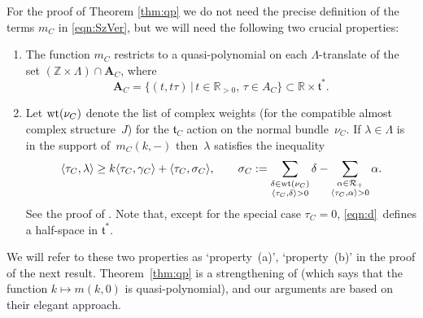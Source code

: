 \documentclass[pdftex]{sigma}
\numberwithin{equation}{section}
\newcommand{\pair}[2]{\langle #1, #2 \rangle}
\newcommand{\tn}[1]{\textnormal{#1}}
\def\t{\ensuremath{\mathfrak{t}}}
\def\R{\ensuremath{\mathcal{R}}}
\def\bR{\ensuremath{\mathbb{R}}}
\def\bZ{\ensuremath{\mathbb{Z}}}
\begin{document}
For the proof of Theorem \ref{thm:qp} we do not need the precise definition of the terms $m_C$ in \eqref{eqn:SzVer}, but we will need the following two crucial properties:
\begin{enumerate}\itemsep=0pt
\item The function $m_C$ restricts to a quasi-polynomial on each $\Lambda$-translate of the set $(\bZ\times \Lambda)\cap \bm{A}_C$, where
\[ \bm{A}_C=\{(t,t\tau)\,|\,t\in \bR_{>0}, \,\tau \in A_C\} \subset \bR \times \t^\ast.\]
\item Let $\tn{wt}(\nu_C)$ denote the list of complex weights (for the compatible almost complex structure~$J$) for the $\t_C$ action on the normal bundle~$\nu_C$. If $\lambda \in \Lambda$ is in the support of~$m_C(k,-)$ then~$\lambda$ satisfies the inequality
\begin{gather}\label{eqn:d}
\pair{\tau_C}{\lambda}\ge k\pair{\tau_C}{\gamma_C}+\pair{\tau_C}{\sigma_C}, \qquad \sigma_C:=\sum_{\substack{\delta \in \tn{wt}(\nu_C)\\ \pair{\tau_C}{\delta}>0}} \delta-\sum_{\substack{\alpha \in \R_+ \\ \pair{\tau_C}{\alpha}>0}}\alpha.
\end{gather}
See the proof of \cite[Theorem~49]{SzenesVergne2010}. Note that, except for the special case $\tau_C=0$, \eqref{eqn:d}~defines a half-space in $\t^\ast$.
\end{enumerate}
We will refer to these two properties as `property~(a)', `property~(b)' in the proof of the next result. Theorem~\ref{thm:qp} is a strengthening of \cite[Theorem~49]{SzenesVergne2010} (which says that the function $k \mapsto m(k,0)$ is quasi-polynomial), and our arguments are based on their elegant approach.
\end{document}
